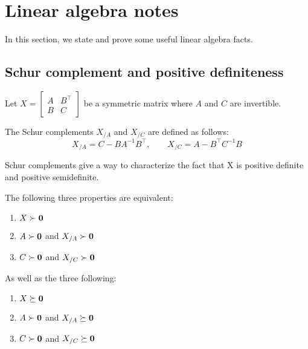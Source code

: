 \chapter{Linear algebra notes}\label{ch:linear_algebra}

In this section, we state and prove some useful linear algebra facts.

\section{Schur complement and positive definiteness}\label{sec:schur_complement}

Let $X = \begin{bmatrix}
             A & B^\top\\
             B & C
\end{bmatrix}$
be a symmetric matrix where $A$ and $C$ are invertible.
\begin{definition}
    The Schur complements $X_{/A}$ and $X_{/C}$ are defined as follows:
    \begin{equation*}
        X_{/A} = C - B A^{-1} B^\top
        ,\qquad
        X_{/C} = A - B^\top C^{-1} B
    \end{equation*}
\end{definition}
Schur complements give a way to characterize the fact that X is positive definite and positive semidefinite.
\begin{lemma}\label{lemma:schur_complement_psd}
The following three properties are equivalent:
\begin{enumerate}
    \item $X \succ \mathbf{0}$
    \item $A \succ \mathbf{0}$ and $X_{/A} \succ \mathbf{0}$
    \item $C \succ \mathbf{0}$ and $X_{/C} \succ \mathbf{0}$
\end{enumerate}
As well as the three following:
\begin{enumerate}
    \item $X \succeq \mathbf{0}$
    \item $A \succ \mathbf{0}$ and $X_{/A} \succeq \mathbf{0}$
    \item $C \succ \mathbf{0}$ and $X_{/C} \succeq \mathbf{0}$
\end{enumerate}
\end{lemma}
